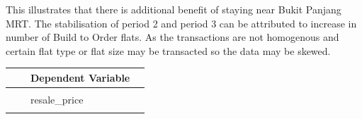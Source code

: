 \documentclass[]{book}
\begin{document}
This illustrates that there is additional benefit of staying near Bukit
Panjang MRT. The stabilisation of period 2 and period 3 can be
attributed to increase in number of Build to Order flats. As the
transactions are not homogenous and certain flat type or flat size may
be transacted so the data may be skewed.

\begin{longtable}[]{@{}llll@{}}
\toprule
\begin{minipage}[b]{0.17\columnwidth}\raggedright\strut
\strut
\end{minipage} & \begin{minipage}[b]{0.24\columnwidth}\raggedright\strut
\strut
\end{minipage} & \begin{minipage}[b]{0.24\columnwidth}\raggedright\strut
Dependent Variable\strut
\end{minipage} & \begin{minipage}[b]{0.24\columnwidth}\raggedright\strut
\strut
\end{minipage}\tabularnewline
\midrule
\endhead
\begin{minipage}[t]{0.17\columnwidth}\raggedright\strut
\strut
\end{minipage} & \begin{minipage}[t]{0.24\columnwidth}\raggedright\strut
\strut
\end{minipage} & \begin{minipage}[t]{0.24\columnwidth}\raggedright\strut
\strut
\end{minipage} & \begin{minipage}[t]{0.24\columnwidth}\raggedright\strut
\strut
\end{minipage}\tabularnewline
\begin{minipage}[t]{0.17\columnwidth}\raggedright\strut
\strut
\end{minipage} & \begin{minipage}[t]{0.24\columnwidth}\raggedright\strut
\strut
\end{minipage} & \begin{minipage}[t]{0.24\columnwidth}\raggedright\strut
resale\_price\strut
\end{minipage} & \begin{minipage}[t]{0.24\columnwidth}\raggedright\strut
\strut
\end{minipage}\tabularnewline
\begin{minipage}[t]{0.17\columnwidth}\raggedright\strut
\strut
\end{minipage} & \begin{minipage}[t]{0.24\columnwidth}\raggedright\strut

\end{minipage}
\end{longtable}
\end{document}
